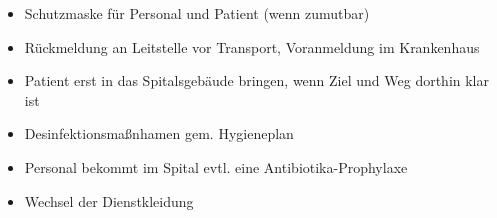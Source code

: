 \label{m:meningitis}
\begin{itemize}
  \item Schutzmaske für Personal und Patient (wenn zumutbar)
  \item Rückmeldung an Leitstelle vor Transport, Voranmeldung im Krankenhaus
  \item Patient erst in das Spitalsgebäude bringen, wenn
  Ziel und Weg dorthin klar ist
  \item Desinfektionsmaßnhamen gem. Hygieneplan
  \item Personal bekommt im Spital evtl. eine Antibiotika-Prophylaxe
  \item Wechsel der Dienstkleidung
\end{itemize}